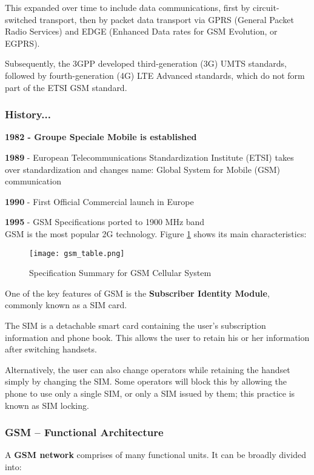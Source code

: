 This expanded over time to include data communications, first by
circuit-switched transport, then by packet data transport via GPRS
(General Packet Radio Services) and EDGE (Enhanced Data rates for GSM
Evolution, or EGPRS).

Subsequently, the 3GPP developed third-generation (3G) UMTS standards, followed
by fourth-generation (4G) LTE Advanced standards, which do not form part of the
ETSI GSM standard.

\subsubsection{History...}

\textbf{1982 - Groupe Speciale Mobile is established}

\textbf{1989} - European Telecommunications Standardization Institute
(ETSI) takes over standardization and changes name: Global System for Mobile
(GSM) communication

\textbf{1990} - First Official Commercial launch in Europe

\textbf{1995} - GSM Specifications ported to 1900 MHz band \\

GSM is the most popular 2G technology. Figure \ref{fig:gsm_table} shows its
main characteristics:

\begin{figure}[H]
  \centering
  \texttt{[image: gsm\_table.png]}
  \caption{Specification Summary for GSM Cellular System }
  \label{fig:gsm_table}
\end{figure}

One of the key features of GSM is the \textbf{Subscriber Identity Module},
commonly known as a SIM card.

The SIM is a detachable smart card containing the user's subscription
information and phone book. This allows the user to retain his or her
information after switching handsets.

Alternatively, the user can also change operators while retaining the handset
simply by changing the SIM. Some operators will block this by allowing the
phone to use only a single SIM, or only a SIM issued by them; this practice
is known as SIM locking.

\subsubsection{GSM – Functional Architecture}

A \textbf{GSM network} comprises of many functional units.
It can be broadly divided into:

